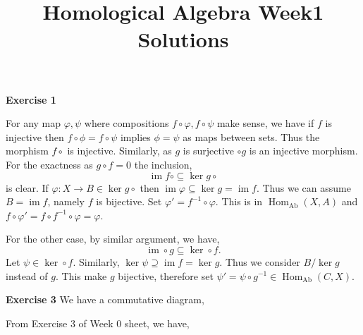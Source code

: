\documentclass[10pt]{article}
\title{Homological Algebra Week1 Solutions}
\author{}
\date{}
\DeclareMathOperator{\Hom}{Hom}
\DeclareMathOperator{\coker}{coker}
\DeclareMathOperator{\image}{im}
\DeclareMathOperator{\Ab}{Ab}
\begin{document}
\maketitle


\par\textbf{Exercise 1}

For any map $\varphi,\psi$ where compositions $f\circ \varphi,f\circ\psi$ make sense, we have if $f$ is injective then $f\circ\phi=f\circ\psi$ implies $\phi=\psi$ as maps between sets. Thus the morphism $f\circ$ is injective. Similarly, as $g$ is surjective $\circ g$ is an injective morphism. For the exactness as $g\circ f = 0$ the inclusion,
\begin{equation*}
    \image  f\circ \subseteq \ker g\circ
\end{equation*}
is clear. If $\varphi:X\to B\in\ker g\circ$ then $\image\varphi\subseteq\ker g = \image f$. Thus we can assume $B=\image f$, namely $f$ is bijective. Set $\varphi' = f^{-1}\circ\varphi$. This is in $\Hom_{\Ab}(X,A)$ and $f\circ \varphi' = f\circ f^{-1}\circ\varphi = \varphi$. 
\par For the other case, by similar argument, we have,
\begin{equation*}
    \image \circ g \subseteq\ker \circ f.
\end{equation*}
Let $\psi\in\ker\circ f$. Similarly, $\ker \psi \supseteq\image f = \ker g$. Thus we consider $B/\ker g$ instead of $g$. This make $g$ bijective, therefore set $\psi' = \psi\circ g^{-1}\in\Hom_{\Ab}(C,X)$.
\par\textbf{Exercise 3}
We have a commutative diagram,
\begin{center}
\end{center}
From Exercise 3 of Week 0 sheet, we have,
\begin{center}
\end{center}
\end{document}
